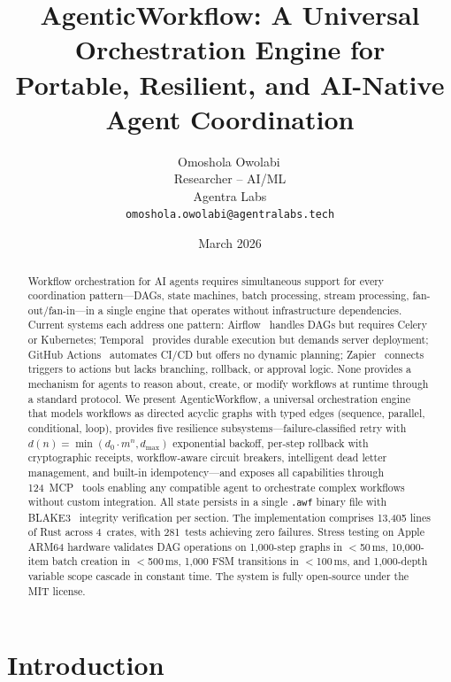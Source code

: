 \documentclass[10pt, twocolumn]{article}
\title{\textbf{AgenticWorkflow: A Universal Orchestration Engine for\\Portable, Resilient, and AI-Native Agent Coordination}}
\author{Omoshola Owolabi\,\orcidlink{0009-0006-4089-0732}\\Researcher -- AI/ML\\Agentra Labs\\\texttt{omoshola.owolabi@agentralabs.tech}}
\date{March 2026}
\begin{document}
\maketitle
\thispagestyle{fancy}

\begin{abstract}
Workflow orchestration for AI agents requires simultaneous support for every coordination pattern---DAGs, state machines, batch processing, stream processing, fan-out/fan-in---in a single engine that operates without infrastructure dependencies. Current systems each address one pattern: Airflow~\cite{airflow} handles DAGs but requires Celery or Kubernetes; Temporal~\cite{temporal} provides durable execution but demands server deployment; GitHub Actions~\cite{ghactions} automates CI/CD but offers no dynamic planning; Zapier~\cite{zapier} connects triggers to actions but lacks branching, rollback, or approval logic. None provides a mechanism for agents to reason about, create, or modify workflows at runtime through a standard protocol. We present AgenticWorkflow, a universal orchestration engine that models workflows as directed acyclic graphs with typed edges (sequence, parallel, conditional, loop), provides five resilience subsystems---failure-classified retry with $d(n) = \min(d_0 \cdot m^n, d_{\max})$ exponential backoff, per-step rollback with cryptographic receipts, workflow-aware circuit breakers, intelligent dead letter management, and built-in idempotency---and exposes all capabilities through 124~MCP~\cite{mcp} tools enabling any compatible agent to orchestrate complex workflows without custom integration. All state persists in a single \texttt{.awf} binary file with BLAKE3~\cite{blake3} integrity verification per section. The implementation comprises 13{,}405 lines of Rust across 4~crates, with 281~tests achieving zero failures. Stress testing on Apple ARM64 hardware validates DAG operations on 1{,}000-step graphs in $<$50\,ms, 10{,}000-item batch creation in $<$500\,ms, 1{,}000 FSM transitions in $<$100\,ms, and 1{,}000-depth variable scope cascade in constant time. The system is fully open-source under the MIT license.
\end{abstract}

\section{Introduction}\label{sec:intro}
\end{document}
